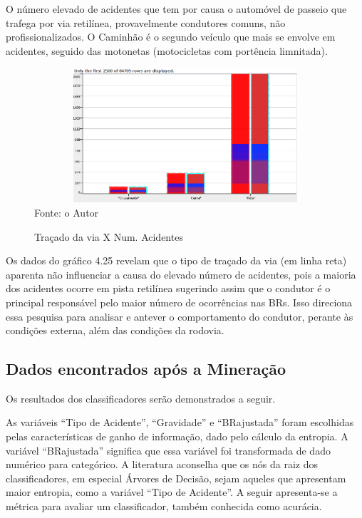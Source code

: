 O número elevado de acidentes que tem por causa o automóvel de passeio que trafega por via retilínea, provavelmente condutores comuns, não profissionalizados.
O Caminhão é o segundo veículo que mais se envolve em acidentes, seguido das motonetas (motocicletas com portência limnitada). 

\pagebreak

\begin{figure}[ht]
\begin{center}
\caption{Traçado da via X Num. Acidentes}
\includegraphics[width=150mm, height=50mm]{Figuras/Preprocess/TracadoViaNumAcident.png}\\
\tiny Fonte: o Autor
\end{center}
\end{figure}


Os dados do gráfico 4.25 revelam que o tipo de traçado da via (em linha reta) aparenta não influenciar a causa do elevado número de acidentes, pois a maioria dos acidentes ocorre em pista retilínea sugerindo assim que o condutor é o principal responsável pelo maior número de ocorrências nas BRs. Isso direciona essa pesquisa para analisar e antever o comportamento do condutor, perante às condições externa, além das condições da rodovia.

\pagebreak



\subsection{Dados encontrados após a Mineração}

Os resultados dos classificadores serão demonstrados a
seguir.

As variáveis “Tipo de Acidente”, “Gravidade” e
“BRajustada” foram escolhidas pelas características de ganho
de informação, dado pelo cálculo da entropia. A variável “BRajustada”
significa que essa variável foi transformada de dado numérico para categórico. A literatura \cite{NorvigRussel2004} aconselha que os nós da raiz dos classificadores, em especial Árvores de Decisão, sejam aqueles que apresentam maior
entropia, como a variável “Tipo de Acidente”.  
A seguir apresenta-se a métrica para avaliar um classificador, também conhecida como acurácia.

